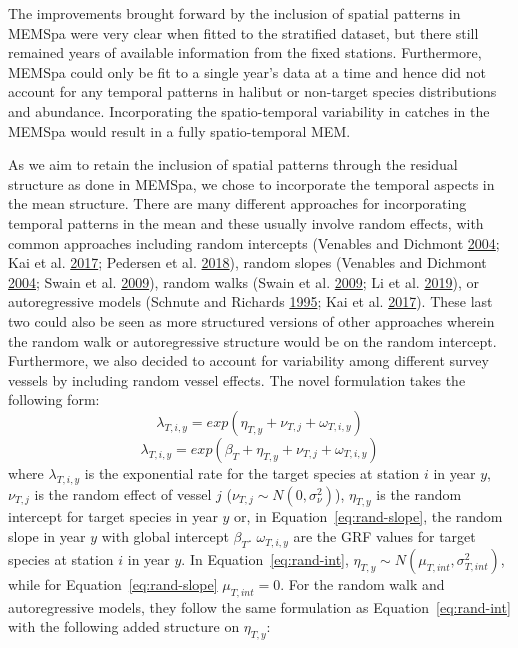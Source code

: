 \documentclass[12pt]{article}\usepackage[]{graphicx}\usepackage[]{color}
\begin{document}
The improvements brought forward by the inclusion of spatial patterns in MEMSpa were very clear when fitted to the stratified dataset, but there still remained years of available information from the fixed stations. Furthermore, MEMSpa could only be fit to a single year's data at a time and hence did not account for any temporal patterns in halibut or non-target species distributions and abundance. Incorporating the spatio-temporal variability in catches in the MEMSpa would result in a fully spatio-temporal MEM.

As we aim to retain the inclusion of spatial patterns through the residual structure as done in MEMSpa, we chose to incorporate the temporal aspects in the mean structure. There are many different approaches for incorporating temporal patterns in the mean and these usually involve random effects, with common approaches including random intercepts (Venables and Dichmont \protect\hyperlink{ref-Venables2004}{2004}; Kai et al. \protect\hyperlink{ref-Kai2017}{2017}; Pedersen et al. \protect\hyperlink{ref-Pedersen2018}{2018}), random slopes (Venables and Dichmont \protect\hyperlink{ref-Venables2004}{2004}; Swain et al. \protect\hyperlink{ref-Swain2009}{2009}), random walks (Swain et al. \protect\hyperlink{ref-Swain2009}{2009}; Li et al. \protect\hyperlink{ref-Li2019}{2019}), or autoregressive models (Schnute and Richards \protect\hyperlink{ref-Schnute1995}{1995}; Kai et al. \protect\hyperlink{ref-Kai2017}{2017}). These last two could also be seen as more structured versions of other approaches wherein the random walk or autoregressive structure would be on the random intercept. Furthermore, we also decided to account for variability among different survey vessels by including random vessel effects. The novel formulation takes the following form:
\begin{equation}\label{eq:rand-int}
\lambda_{T,i,y} = exp(\eta_{T,y}+ \nu_{T,j}+\omega_{T,i,y})
\end{equation} \begin{equation}\label{eq:rand-slope}
\lambda_{T,i,y} = exp(\beta_T+\eta_{T,y}+ \nu_{T,j}+\omega_{T,i,y})
\end{equation}
where \(\lambda_{T,i,y}\) is the exponential rate for the target species at station \(i\) in year \(y\), \(\nu_{T,j}\) is the random effect of vessel \(j\) (\(\nu_{T,j} \sim N(0,\sigma_\nu^2)\)), \(\eta_{T,y}\) is the random intercept for target species in year \(y\) or, in Equation~\ref{eq:rand-slope}, the random slope in year \(y\) with global intercept \(\beta_T\). \(\omega_{T,i,y}\) are the GRF values for target species at station \(i\) in year \(y\). In Equation~\ref{eq:rand-int}, \(\eta_{T,y} \sim N(\mu_{T,int},\sigma_{T,int}^2)\), while for Equation~\ref{eq:rand-slope} \(\mu_{T,int}=0\). For the random walk and autoregressive models, they follow the same formulation as Equation~\ref{eq:rand-int} with the following added structure on \(\eta_{T,y}\):
\end{document}

